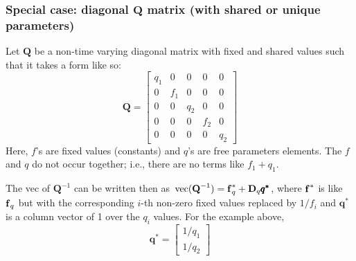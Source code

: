 \documentclass[]{article}
\def\DD{\mbox{$\mathbf D$}}	\def\dd{\mbox{$\mathbf d$}}
\def\QQ{\mbox{$\mathbf Q$}}	 \def\qq{\mbox{$\mathbf q$}}
\def\vec{\,\textup{\textrm{vec}}}
\begin{document}
\subsubsection{Special case: diagonal $\QQ$ matrix (with shared or unique parameters)}
Let $\QQ$ be a non-time varying diagonal matrix with fixed and shared values such that it takes a form like so:
\begin{equation*}
\QQ=
\begin{bmatrix}
q_1&0&0&0&0\\
0&f_1&0&0&0\\
0&0&q_2&0&0\\
0&0&0&f_2&0\\
0&0&0&0&q_2
\end{bmatrix}
\end{equation*}
Here, $f$'s are fixed values (constants) and $q$'s are free parameters elements.  The $f$ and $q$ do not occur together; i.e., there are no terms like $f_1+q_1$.


The vec of $\QQ^{-1}$ can be written then as $\vec(\QQ^{-1}) = \ff^{*}_q + \DD_q \pmb{q^{*}}$, where $\mbox{$\mathbf f$}^{*}$ is like $\mbox{$\mathbf f$}_q$ but with the corresponding $i$-th non-zero fixed values replaced by $1/f_i$ and $\pmb{q^{*}}$ is a column vector of 1 over the $q_i$ values.  For the example above,
\begin{equation*}
\pmb{q^{*}} =
\begin{bmatrix}
1/q_1 \\ 1/q_2
\end{bmatrix}
\end{equation*}
\end{document}
